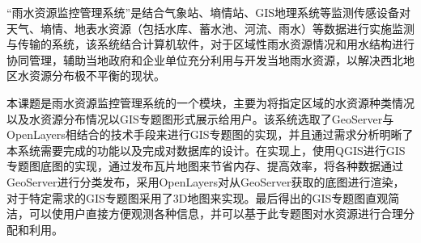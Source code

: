 “雨水资源监控管理系统”是结合气象站、墒情站、GIS地理系统等监测传感设备对天气、墒情、地表水资源（包括水库、蓄水池、河流、雨水）等数据进行实施监测与传输的系统，该系统结合计算机软件，对于区域性雨水资源情况和用水结构进行协同管理，辅助当地政府和企业单位充分利用与开发当地雨水资源，以解决西北地区水资源分布极不平衡的现状。

本课题是雨水资源监控管理系统的一个模块，主要为将指定区域的水资源种类情况以及水资源分布情况以GIS专题图形式展示给用户。该系统选取了GeoServer与OpenLayers相结合的技术手段来进行GIS专题图的实现，并且通过需求分析明晰了本系统需要完成的功能以及完成对数据库的设计。在实现上，使用QGIS进行GIS专题图底图的实现，通过发布瓦片地图来节省内存、提高效率，将各种数据通过GeoServer进行分类发布，采用OpenLayers对从GeoServer获取的底图进行渲染，对于特定需求的GIS专题图采用了3D地图来实现。最后得出的GIS专题图直观简洁，可以使用户直接方便观测各种信息，并可以基于此专题图对水资源进行合理分配和利用。

